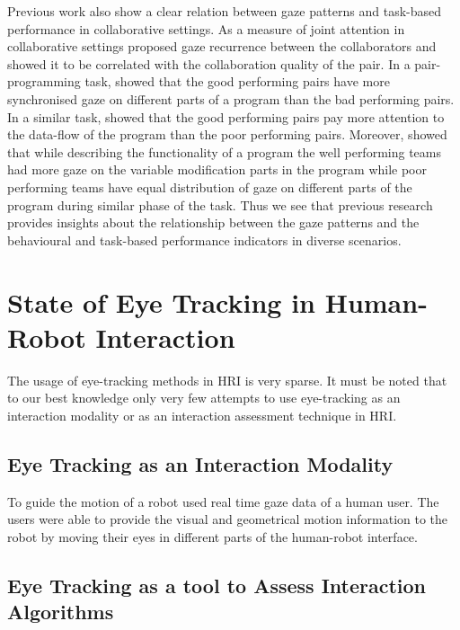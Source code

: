 \documentclass{sig-alternate}
\begin{document}
Previous work also show a clear relation between gaze patterns and
task-based performance in collaborative settings. As a measure of joint attention in collaborative settings  \cite{richardson2007art} proposed gaze recurrence between the collaborators and showed it to be correlated with the collaboration quality of the pair. In a pair-programming task, \cite{jermann2012effects} showed that the good performing pairs have more synchronised gaze on different parts of a program than the bad performing pairs. In a similar task, \cite{sharma2012gaze} showed that the good performing pairs pay more attention to the data-flow of the program than the poor performing pairs. Moreover, \cite{sharma2013understanding} showed that while describing the functionality of a program the well performing teams had more gaze on the variable modification parts in the program while poor performing teams have equal distribution of gaze on different parts of the program during similar phase of the task.  Thus we see that previous research provides insights about the relationship between the gaze patterns and the behavioural and task-based performance indicators in diverse scenarios.





\section{State of Eye Tracking in Human-Robot Interaction}
\label{et_robotics}

The usage of eye-tracking methods in HRI is very sparse. It must be noted that to our best knowledge only very few attempts to use eye-tracking as an interaction modality or as an interaction assessment technique in HRI.

\subsection{Eye Tracking as an Interaction Modality}

To guide the motion of a robot \cite{bhuiyan2004tracking} used real time  gaze data of a human user. The users were able to provide the visual and geometrical motion information to the robot by moving their eyes in different parts of the human-robot interface.

\subsection{Eye Tracking as a tool to Assess Interaction Algorithms}
\end{document}
